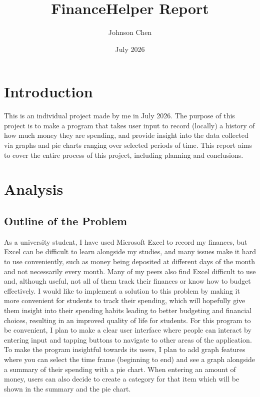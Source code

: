 \documentclass{article}
\title{FinanceHelper Report}
\author{Johnson Chen}
\date{July 2026}
\begin{document}
\maketitle

\tableofcontents
\newpage

\section{Introduction}
This is an individual project made by me in July 2026. The purpose of this project is to make a program that takes user input to record (locally) a history of how much money they are spending, and provide insight into the data collected via graphs and pie charts ranging over selected periods of time. This report aims to cover the entire process of this project, including planning and conclusions.

\section{Analysis}
\subsection{Outline of the Problem}
As a university student, I have used Microsoft Excel to record my finances, but Excel can be difficult to learn alongside my studies, and many issues make it hard to use conveniently, such as money being deposited at different days of the month and not necessarily every month. Many of my peers also find Excel difficult to use and, although useful, not all of them track their finances or know how to budget effectively. I would like to implement a solution to this problem by making it more convenient for students to track their spending, which will hopefully give them insight into their spending habits leading to better budgeting and financial choices, resulting in an improved quality of life for students.
For this program to be convenient, I plan to make a clear user interface where people can interact by entering input and tapping buttons to navigate to other areas of the application. To make the program insightful towards its users, I plan to add graph features where you can select the time frame (beginning to end) and see a graph alongside a summary of their spending with a pie chart. When entering an amount of money, users can also decide to create a category for that item which will be shown in the summary and the pie chart.
\end{document}
